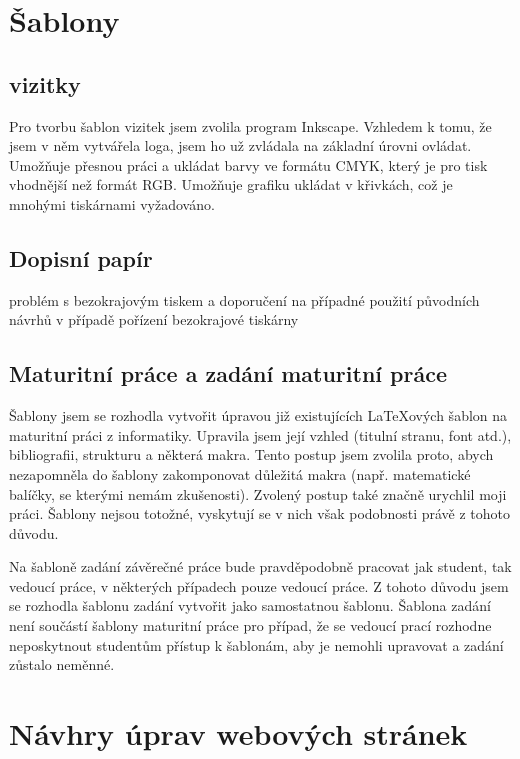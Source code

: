 \documentclass[11pt,a4paper,twoside,openright]{report}
\begin{document}
\section{Šablony}
\subsection{vizitky}
Pro tvorbu šablon vizitek jsem zvolila program Inkscape. Vzhledem k tomu, že jsem v něm vytvářela loga, jsem ho už zvládala na základní úrovni ovládat. Umožňuje přesnou práci a ukládat barvy ve formátu CMYK, který je pro tisk vhodnější než formát RGB. Umožňuje grafiku ukládat v křivkách, což je mnohými tiskárnami vyžadováno.


\subsection{Dopisní papír}
problém s bezokrajovým tiskem a doporučení na případné použití původních návrhů v případě pořízení bezokrajové tiskárny

\subsection{Maturitní práce a zadání maturitní práce}
Šablony jsem se rozhodla vytvořit úpravou již existujících LaTeXových šablon na maturitní práci z informatiky. Upravila jsem její vzhled (titulní stranu, font atd.), bibliografii, strukturu a některá makra. Tento postup jsem zvolila proto, abych nezapomněla do šablony zakomponovat důležitá makra (např. matematické balíčky, se kterými nemám zkušenosti). Zvolený postup také značně urychlil moji práci. Šablony nejsou totožné, vyskytují se v nich však podobnosti právě z tohoto důvodu.

Na šabloně zadání závěrečné práce bude pravděpodobně pracovat jak student, tak vedoucí práce, v některých případech pouze vedoucí práce. Z tohoto důvodu jsem se rozhodla šablonu zadání vytvořit jako samostatnou šablonu. Šablona zadání není součástí šablony maturitní práce pro případ, že se vedoucí prací rozhodne neposkytnout studentům přístup k šablonám, aby je nemohli upravovat a zadání zůstalo neměnné.

\section{Návhry úprav webových stránek}
\end{document}
